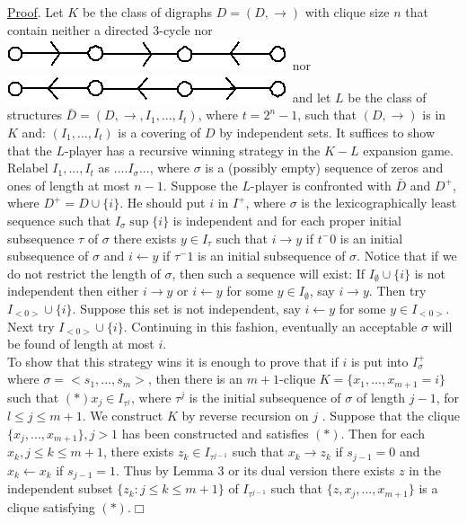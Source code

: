 \documentclass[twoside]{article}
\begin{document}
\newline
\underline{Proof}.    Let   $K$   be the class of digraphs   $D = (D,\rightarrow)$   with clique size   $n$ that contain neither a directed 3-cycle nor \includegraphics[scale=0.25]{figures/small/1.png}   nor \includegraphics[scale=0.25]{figures/small/2.png} and let   $L$   be the class of structures   $\bar{D} = (D,\rightarrow,I_1,...,I_t)$, where   $t = 2^n - 1$, such that    $(D,\rightarrow)$    is in   $K$   and:  $(I_1,...,I_t)$    is a covering of   $D$ by independent sets.    
It suffices to show that the   $L$-player has a recursive winning strategy in the   $K-L$   expansion game.   
Relabel   $I_1,...,I_t$ as $....I_\sigma...$, where $\sigma$   is a (possibly empty) sequence of zeros and ones of length at most   $n-1$.    Suppose the   $L$-player is confronted with  $\bar{D}$   and   $D^+$, where   $D^+ = D\cup \{i\}$.    
He   should put   $i$   in   $I^+$, where  $\sigma$   is the lexicographically least sequence such that   $I_\sigma \sup \{i\}$ is independent and for each proper initial subsequence  $\tau$   of $\sigma$   there exists   $y\in I_\tau$   such that $i\rightarrow y$ if   $t^-0$   is an initial subsequence of $\sigma$   and   $i\leftarrow y$   if   $\tau^-1$   is an initial subsequence of   $\sigma$. 
Notice that if we do not restrict the length of $\sigma$, then such a sequence will exist: If $I_\emptyset \cup \{i\}$ is not independent then either $i \rightarrow y$ or $i \leftarrow y$ for some $y \in I_\emptyset$, say $i \rightarrow y$. Then try $I_{<0>} \cup \{i\}$. 
Suppose this set is not independent, say $i \leftarrow y$ for some $y \in I_{<0>}$. Next try
$I_{<0>} \cup \{i\}$. Continuing in this fashion, eventually an acceptable $\sigma$ will be found of length at most $i$.\\
\indent To show that this strategy wins it is enough to prove that if   $i$   is put
into   $I_\sigma^+$   where   $\sigma = <s_1,...,s_m>$, then there is an $m+1$-clique
$K=\{x_1,...,x_{m+1}=i\}$ such that $(*) x_j \in I_{\tau^j}$, where $\tau^j$ is the initial subsequence
of  $\sigma$  of length $j-1$, for   $l\leq j\leq m+1$.   We construct   $K$   by reverse recursion on
$j$ .    Suppose that the clique $\{x_j,...,x_{m+1}\}, j>1$ has been constructed and
satisfies $(*)$.   Then for each   $x_k, j\leq k\leq m+1$, there exists   $z_k\in I_{\tau^{j-1}}$   such that
$x_k \rightarrow z_k$ if   $s_{j-1}=0$   and  $x_k \leftarrow x_k$	if $s_{j-1} = 1$.   Thus by Lemma 3 or its dual
version there exists   $z$   in the independent subset $\{z_k:j\leq k \leq m+1\}$   of $I_{\tau^{j-1}}$ such that $\{z,x_j,...,x_{m+1}\}$    is a clique satisfying $(*)$.$\Box$\\
\end{document}
